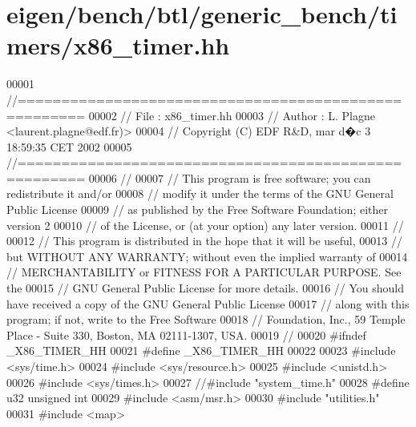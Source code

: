 \hypertarget{eigen_2bench_2btl_2generic__bench_2timers_2x86__timer_8hh_source}{}\section{eigen/bench/btl/generic\+\_\+bench/timers/x86\+\_\+timer.hh}
\label{eigen_2bench_2btl_2generic__bench_2timers_2x86__timer_8hh_source}

\begin{DoxyCode}
00001 \textcolor{comment}{//=====================================================}
00002 \textcolor{comment}{// File   :  x86\_timer.hh}
00003 \textcolor{comment}{// Author :  L. Plagne <laurent.plagne@edf.fr)>        }
00004 \textcolor{comment}{// Copyright (C) EDF R&D,  mar d�c 3 18:59:35 CET 2002}
00005 \textcolor{comment}{//=====================================================}
00006 \textcolor{comment}{// }
00007 \textcolor{comment}{// This program is free software; you can redistribute it and/or}
00008 \textcolor{comment}{// modify it under the terms of the GNU General Public License}
00009 \textcolor{comment}{// as published by the Free Software Foundation; either version 2}
00010 \textcolor{comment}{// of the License, or (at your option) any later version.}
00011 \textcolor{comment}{// }
00012 \textcolor{comment}{// This program is distributed in the hope that it will be useful,}
00013 \textcolor{comment}{// but WITHOUT ANY WARRANTY; without even the implied warranty of}
00014 \textcolor{comment}{// MERCHANTABILITY or FITNESS FOR A PARTICULAR PURPOSE.  See the}
00015 \textcolor{comment}{// GNU General Public License for more details.}
00016 \textcolor{comment}{// You should have received a copy of the GNU General Public License}
00017 \textcolor{comment}{// along with this program; if not, write to the Free Software}
00018 \textcolor{comment}{// Foundation, Inc., 59 Temple Place - Suite 330, Boston, MA  02111-1307, USA.}
00019 \textcolor{comment}{// }
00020 \textcolor{preprocessor}{#ifndef \_X86\_TIMER\_HH}
00021 \textcolor{preprocessor}{#define \_X86\_TIMER\_HH}
00022 
00023 \textcolor{preprocessor}{#include <sys/time.h>}
00024 \textcolor{preprocessor}{#include <sys/resource.h>}
00025 \textcolor{preprocessor}{#include <unistd.h>}
00026 \textcolor{preprocessor}{#include <sys/times.h>}
00027 \textcolor{comment}{//#include "system\_time.h"}
00028 \textcolor{preprocessor}{#define u32 unsigned int}
00029 \textcolor{preprocessor}{#include <asm/msr.h>}
00030 \textcolor{preprocessor}{#include "utilities.h"}
00031 \textcolor{preprocessor}{#include <map>}

\end{DoxyCode}
